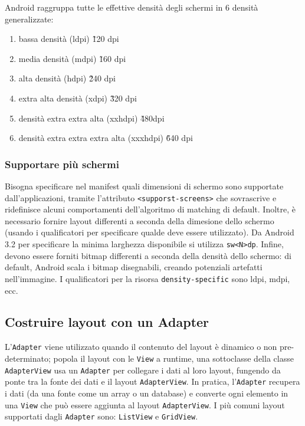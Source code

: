 Android raggruppa tutte le effettive densità degli schermi in 6 densità
generalizzate:

\begin{enumerate}
\item bassa densità (ldpi) \~ 120 dpi
\item media densità (mdpi) \~ 160 dpi
\item alta densità (hdpi) \~ 240 dpi
\item extra alta densità (xdpi) \~ 320 dpi
\item densità extra extra alta (xxhdpi) \~ 480dpi
\item densità extra extra extra alta (xxxhdpi) \~ 640 dpi
\end{enumerate}

\subsubsection{Supportare più schermi}

Bisogna specificare nel manifest quali dimensioni di schermo sono supportate
dall'applicazioni, tramite l'attributo \texttt{<supporst-screens>} che
sovrascrive e ridefinisce alcuni comportamenti dell'algoritmo di matching di
default.
Inoltre, è necessario fornire layout differenti a seconda della dimesione dello
schermo (usando i qualificatori per specificare qualde deve essere utilizzato).
Da Android 3.2 per specificare la minima larghezza disponibile si utilizza
\texttt{sw<N>dp}.
Infine, devono essere forniti bitmap differenti a seconda della densità dello
schermo: di default, Android scala i bitmap disegnabili, creando potenziali
artefatti nell'immagine. I qualificatori per la risorsa
\texttt{density-specific} sono ldpi, mdpi, ecc.

\subsection{Costruire layout con un Adapter}

L'\texttt{Adapter} viene utilizzato quando il contenuto del layout è dinamico o
non pre-determinato; popola il layout con le \texttt{View} a runtime, una
sottoclasse della classe \texttt{AdapterView} usa un \texttt{Adapter} per
collegare i dati al loro layout, fungendo da ponte tra la fonte dei dati e il
layout \texttt{AdapterView}. In pratica, l'\texttt{Adapter} recupera i dati (da
una fonte come un array o un database) e converte ogni elemento in una
\texttt{View} che può essere aggiunta al layout \texttt{AdapterView}.
I più comuni layout supportati dagli \texttt{Adapter} sono: \texttt{ListView} e
\texttt{GridView}.

